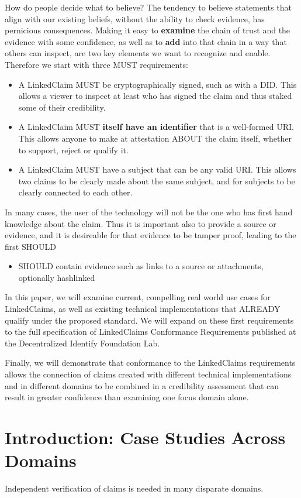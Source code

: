\documentclass[11pt]{article}
\begin{document}
How do people decide what to believe?  The tendency to believe statements that align with our existing beliefs, without the ability to check evidence, has pernicious consequences.  Making it easy to \textbf{examine} the chain of trust and the evidence with some confidence, as well as to \textbf{add} into that chain in a way that others can inspect, are two key elements we want to recognize and enable.  Therefore we start with three MUST requirements: 
\begin{itemize}
    \item A LinkedClaim MUST be cryptographically signed, such as with a DID.  This allows a viewer to inspect at least who has signed the claim and thus staked some of their credibility.
    \item A LinkedClaim MUST \textbf{itself have an identifier} that is a well-formed URI.  This allows anyone to make at attestation ABOUT the claim itself, whether to support, reject or qualify it.
    \item A LinkedClaim MUST have a subject that can be any valid URI.  This allows two claims to be clearly made about the same subject, and for subjects to be clearly connected to each other.
\end{itemize}
In many cases, the user of the technology will not be the one who has first hand knowledge about the claim.  Thus it is important also to provide a source or evidence, and it is desireable for that evidence to be tamper proof, leading to the first SHOULD
\begin{itemize}
    \item SHOULD contain evidence such as links to a source or attachments, optionally hashlinked
\end{itemize}
In this paper, we will examine current, compelling real world use cases for LinkedClaims, as well as existing technical implementations that ALREADY qualify under the proposed standard. We will expand on these first requirements to the full specification of LinkedClaims Conformance Requirements published at the Decentralized Identify Foundation Lab.

Finally, we will demonstrate that conformance to the LinkedClaims requirements allows the connection of claims created with different technical implementations and in different domains to be combined in a credibility assessment that can result in greater confidence than examining one focus domain alone.

\section{Introduction: Case Studies Across Domains}
Independent verification of claims is needed in many disparate domains.
\end{document}
